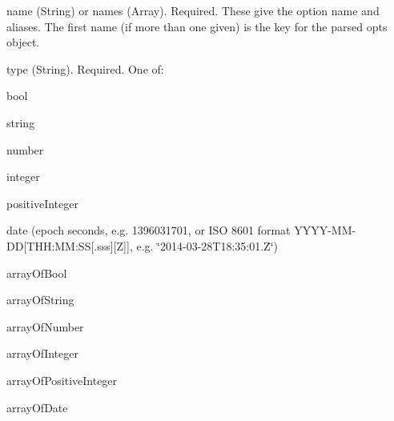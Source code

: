\begin{DoxyItemize}
\item {\ttfamily name} (String) or {\ttfamily names} (Array). Required. These give the option name and aliases. The first name (if more than one given) is the key for the parsed {\ttfamily opts} object.
\item {\ttfamily type} (String). Required. One of\+:
\begin{DoxyItemize}
\item bool
\item string
\item number
\item integer
\item positive\+Integer
\item date (epoch seconds, e.\+g. 1396031701, or I\+SO 8601 format {\ttfamily Y\+Y\+Y\+Y-\/\+M\+M-\/\+DD\mbox{[}T\+H\+H\+:\+MM\+:SS\mbox{[}.sss\mbox{]}\mbox{[}Z\mbox{]}\mbox{]}}, e.\+g. \char`\"{}2014-\/03-\/28\+T18\+:35\+:01.\+Z\char`\"{})
\item array\+Of\+Bool
\item array\+Of\+String
\item array\+Of\+Number
\item array\+Of\+Integer
\item array\+Of\+Positive\+Integer
\item array\+Of\+Date
\end{DoxyItemize}


\end{DoxyItemize}
